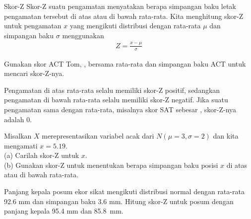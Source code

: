 \begin{onebox}{Skor-Z}
  Skor-Z suatu pengamatan menyatakan berapa simpangan baku letak
  pengamatan tersebut di atas atau di bawah rata-rata.
  Kita menghitung skor-Z untuk pengamatan $x$ yang mengikuti distribusi
  dengan rata-rata $\mu$ dan simpangan baku $\sigma$ menggunakan
  \begin{align*}
  Z = \frac{x - \mu}{\sigma}
  \end{align*}
\end{onebox}

\begin{exercisewrap}
\begin{nexercise}
Gunakan skor ACT Tom, \tomsatscore{}, bersama rata-rata dan
simpangan baku ACT untuk mencari skor-Z-nya.\footnotemark{}
\end{nexercise}
\end{exercisewrap}

Pengamatan di atas rata-rata selalu memiliki skor-Z positif,
sedangkan pengamatan di bawah rata-rata selalu memiliki skor-Z negatif.
Jika suatu pengamatan sama dengan rata-rata, misalnya skor SAT
sebesar \satmean{}, skor-Z-nya adalah $0$.

\begin{exercisewrap}
\begin{nexercise}
Misalkan $X$ merepresentasikan variabel acak dari
$N(\mu=3, \sigma=2)$ dan kita mengamati $x=5.19$. \\
(a)
    Carilah skor-Z untuk $x$. \\
(b)
    Gunakan skor-Z untuk menentukan berapa simpangan baku posisi $x$
    di atas atau di bawah rata-rata.\footnotemark{}
\end{nexercise}
\end{exercisewrap}

\begin{exercisewrap}
\begin{nexercise} \label{headLZScore}
Panjang kepala posum ekor sikat mengikuti distribusi normal
dengan rata-rata 92.6 mm dan simpangan baku 3.6 mm.
Hitung skor-Z untuk posum dengan panjang kepala 95.4 mm
dan 85.8~mm.\footnotemark{}
\end{nexercise}
\end{exercisewrap}

